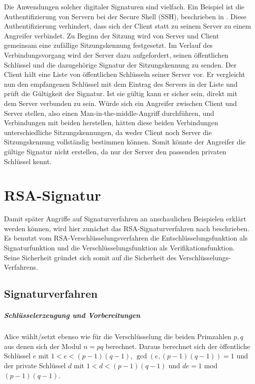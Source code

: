 \documentclass[a4paper,12pt,oneside]{scrreprt}
\begin{document}
Die Anwendungen solcher digitaler Signaturen sind vielfach. Ein Beispiel ist die Authentifizierung von Servern bei der Secure Shell (SSH), beschrieben in \cite{barrett2005ssh}. Diese Authentifizierung verhindert, dass sich der Client statt zu seinem Server zu einem Angreifer verbindet. Zu Beginn der Sitzung wird von Server und Client gemeinsam eine zufällige Sitzungskennung festgesetzt. Im Verlauf des Verbindungsvorgang wird der Server dazu aufgefordert, seinen öffentlichen Schlüssel und die dazugehörige Signatur der Sitzungskennung zu senden. Der Client hält eine Liste von öffentlichen Schlüsseln seiner Server vor. Er vergleicht nun den empfangenen Schlüssel mit dem Eintrag des Servers in der Liste und prüft die Gültigkeit der Signatur. Ist sie gültig kann er sicher sein, direkt mit dem Server verbunden zu sein. Würde sich ein Angreifer zwischen Client und Server stellen, also einen Man-in-the-middle-Angriff durchführen, und Verbindungen mit beiden herstellen, hätten diese beiden Verbindungen unterschiedliche Sitzungskennungen, da weder Client noch Server die Sitzungskennung vollständig bestimmen können. Somit könnte der Angreifer die gültige Signatur nicht erstellen, da nur der Server den passenden privaten Schlüssel kennt. 





\chapter{RSA-Signatur}

Damit später Angriffe auf Signaturverfahren an anschaulichen Beispielen erklärt werden können, wird hier zunächst das RSA-Signaturverfahren nach \cite{Rivest78amethod} beschrieben. Es benutzt vom RSA-Verschlüsselungsverfahren die Entschlüsselungsfunktion als Signaturfunktion und die Verschlüsselungsfunktion als Verifikationsfunktion. Seine Sicherheit gründet sich somit auf die Sicherheit des Verschlüsselungs-Verfahrens. 

\section{Signaturverfahren}

\paragraph{Schlüsselerzeugung und Vorbereitungen}

Alice wählt/setzt ebenso wie für die Verschlüsselung die beiden Primzahlen $p, q$ aus denen sich der Modul $n = pq$ berechnet. Daraus berechnet sich der öffentliche Schlüssel $e$ mit $1 < e < (p-1)(q-1)$, $\gcd(e,(p-1)(q-1)) = 1$ und der private Schlüssel $d$ mit $1 < d < (p-1)(q-1)$ und $de = 1$ mod $(p-1)(q-1)$. 
\end{document}
